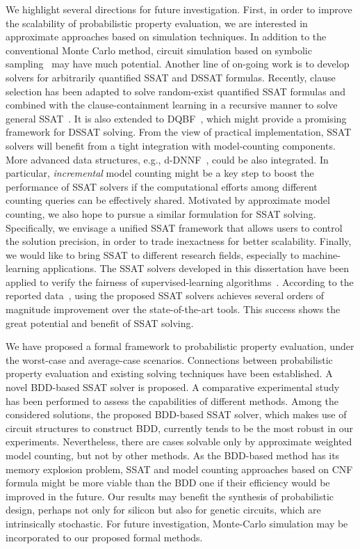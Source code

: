 We highlight several directions for future investigation.
First, in order to improve the scalability of probabilistic property evaluation,
we are interested in approximate approaches based on simulation techniques.
In addition to the conventional Monte Carlo method,
circuit simulation based on symbolic sampling~\cite{KravetsDAC19ECOSampling} may have much potential.
Another line of on-going work is to develop solvers for arbitrarily quantified SSAT and DSSAT formulas.
Recently, clause selection has been adapted to solve random-exist quantified SSAT formulas
and combined with the clause-containment learning in a recursive manner to solve general SSAT~\cite{Chen2021}.
It is also extended to DQBF~\cite{Tentrup2019},
which might provide a promising framework for DSSAT solving.
From the view of practical implementation,
SSAT solvers will benefit from a tight integration with model-counting components.
More advanced data structures, e.g., d-DNNF~\cite{Darwiche2001,Darwiche2002dDNNF}, could be also integrated.
In particular, \textit{incremental} model counting might be a key step to boost the performance of SSAT solvers
if the computational efforts among different counting queries can be effectively shared.
Motivated by approximate model counting,
we also hope to pursue a similar formulation for SSAT solving.
Specifically, we envisage a unified SSAT framework that allows users to control the solution precision,
in order to trade inexactness for better scalability.
Finally, we would like to bring SSAT to different research fields, especially to machine-learning applications.
The SSAT solvers developed in this dissertation have been applied to verify the fairness of supervised-learning algorithms~\cite{Ghosh2021}.
According to the reported data~\cite{Ghosh2021},
using the proposed SSAT solvers achieves several orders of magnitude improvement over the state-of-the-art tools.
This success shows the great potential and benefit of SSAT solving.

\iffalse
    We have proposed a formal framework to probabilistic property
    evaluation, under the worst-case and average-case scenarios.
    Connections between probabilistic property evaluation and existing
    solving techniques have been established. A novel BDD-based SSAT solver is proposed. A comparative experimental study has been performed to assess the capabilities
    of different methods. Among the considered solutions, the proposed BDD-based SSAT solver, which makes use of circuit structures to construct BDD, currently tends to be the most robust in our experiments. Nevertheless, there are cases solvable only by approximate weighted model counting, but not by other methods. As the BDD-based method has its memory explosion problem, SSAT and model
    counting approaches based on CNF formula might be more viable than the BDD one if their efficiency would be improved in the future. Our results may benefit the synthesis of probabilistic design, perhaps not only for silicon but also for genetic circuits, which are intrinsically stochastic. For future investigation, Monte-Carlo simulation may be incorporated to our proposed formal methods.

